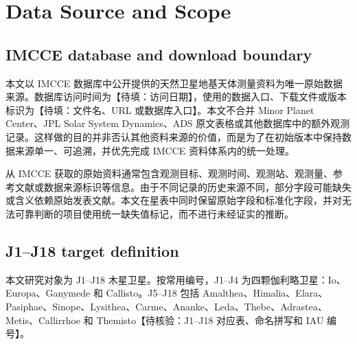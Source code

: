 \documentclass{aastex701}
\begin{document}
\section{Data Source and Scope} \label{sec:data}

\subsection{IMCCE database and download boundary} \label{subsec:imcce}

本文以 IMCCE 数据库中公开提供的天然卫星地基天体测量资料为唯一原始数据来源。数据库访问时间为【待填：访问日期】，使用的数据入口、下载文件或版本标识为【待填：文件名、URL 或数据库入口】。本文不合并 Minor Planet Center、JPL Solar System Dynamics、ADS 原文表格或其他数据库中的额外观测记录。这样做的目的并非否认其他资料来源的价值，而是为了在初始版本中保持数据来源单一、可追溯，并优先完成 IMCCE 资料体系内的统一处理。

从 IMCCE 获取的原始资料通常包含观测目标、观测时间、观测站、观测量、参考文献或数据来源标识等信息。由于不同记录的历史来源不同，部分字段可能缺失或含义依赖原始发表文献。本文在星表中同时保留原始字段和标准化字段，并对无法可靠判断的项目使用统一缺失值标记，而不进行未经证实的推断。

\subsection{J1--J18 target definition} \label{subsec:targets}

本文研究对象为 J1--J18 木星卫星。按常用编号，J1--J4 为四颗伽利略卫星：Io、Europa、Ganymede 和 Callisto。J5--J18 包括 Amalthea、Himalia、Elara、Pasiphae、Sinope、Lysithea、Carme、Ananke、Leda、Thebe、Adrastea、Metis、Callirrhoe 和 Themisto【待核验：J1--J18 对应表、命名拼写和 IAU 编号】。
\end{document}
